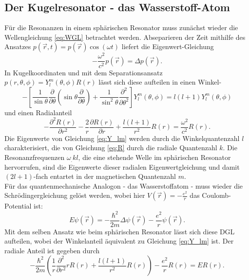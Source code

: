 \subsection{Der Kugelresonator - das Wasserstoff-Atom}

Für die Resonanzen in einem sphärischen Resonator muss zunächst wieder die Wellengleichung \eqref{eq:WGL} betrachtet werden. Abseparieren der Zeit mithilfe des Ansatzes $p(\vec{r},t)=p(\vec{r})\cos{(\omega t)}$ liefert die Eigenwert-Gleichung
\begin{equation*}
-\frac{\omega^2}{c^2}p(\vec{r})=\Delta p(\vec{r})\text{.}
\end{equation*}
In Kugelkoordinaten und mit dem Separationsansatz $p(r,\theta,\phi)=Y^m_l(\theta,\phi)R(r)$ lässt sich diese aufteilen in einen Winkel-
\begin{equation}
-\left[\frac{1}{\sin{\theta}}\frac{\partial}{\partial\theta}\left(\sin{\theta}\frac{\partial}{\partial\theta}\right)+\frac{1}{\sin^2{\theta}}\frac{\partial^2}{\partial\theta^2}\right]Y^m_l(\theta,\phi)=l(l+1)Y^m_l(\theta,\phi)\label{eq:Y_lm}
\end{equation}
und einen Radialanteil 
\begin{equation}
-\frac{\partial^2 R(r)}{\partial r^2}-\frac{2}{r}\frac{\partial R(r)}{\partial r}+\frac{l(l+1)}{r^2}R(r)=\frac{\omega^2}{c^2}R(r)\text{.}\label{eq:R}
\end{equation}
Die Eigenwerte von Gleichung \eqref{eq:Y_lm} werden durch die Winkelquantenzahl $l$ charakterisiert, die von Gleichung \eqref{eq:R} durch die radiale Quantenzahl $k$. Die Resonanzfrequenzen $\omega_.{k l}$, die eine stehende Welle im sphärischen Resonator hervorrufen, sind die Eigenwerte dieser radialen Eigenwertgleichung und damit $(2l+1)$-fach entartet in der magnetischen Quantenzahl $m$.\\
\newline
Für das quantenmechanische Analogon - das Wasserstoffatom - muss wieder die Schrödingergleichung gelöst werden, wobei hier $V(\vec{r})=-\frac{e^2}{r}$ das Coulomb-Potential ist:
\[
E\psi(\vec{r})=-\frac{\hbar^2}{2m}\Delta\psi(\vec{r})-\frac{e^2}{r}\psi(\vec{r})\text{.}
\]
Mit dem selben Ansatz wie beim sphärischen Resonator lässt sich diese DGL aufteilen, wobei der Winkelanteil äquivalent zu Gleichung \eqref{eq:Y_lm} ist. Der radiale Anteil ist gegeben durch 
\begin{equation}
-\frac{\hbar^2}{2m}\left(\frac{1}{r}\frac{\partial^2}{\partial r^2}r R(r)+\frac{l(l+1)}{r^2}R(r)\right)-\frac{e^2}{r}R(r)=E R(r)\text{.}\label{eq:R2}
\end{equation}

